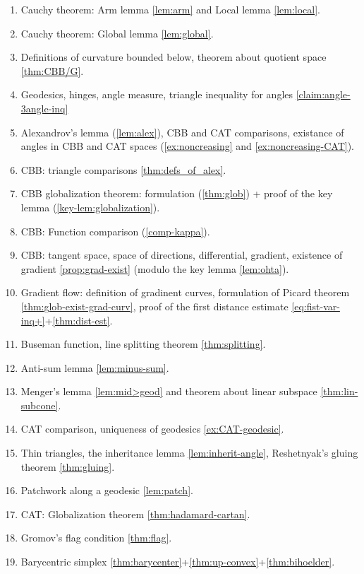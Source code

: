 \begin{enumerate}
\item Cauchy theorem: Arm lemma \ref{lem:arm} and Local lemma \ref{lem:local}.
\item Cauchy theorem: Global lemma \ref{lem:global}.
\item Definitions of curvature bounded below, theorem about quotient space \ref{thm:CBB/G}.
\item Geodesics, hinges, angle measure, triangle inequality for angles \ref{claim:angle-3angle-inq}
\item Alexandrov's lemma (\ref{lem:alex}), CBB and CAT comparisons,
existance of angles in CBB and CAT spaces (\ref{ex:noncreasing} and \ref{ex:noncreasing-CAT}).
\item CBB: triangle comparisons \ref{thm:defs_of_alex}.
\item CBB globalization theorem: formulation (\ref{thm:glob})  + proof of the key lemma (\ref{key-lem:globalization}). 
\item CBB: Function comparison (\ref{comp-kappa}).
\item CBB: tangent space, space of directions, differential, gradient, existence of gradient \ref{prop:grad-exist} (modulo the key lemma \ref{lem:ohta}).
\item Gradient flow: definition of gradinent curves, formulation of Picard theorem \ref{thm:glob-exist-grad-curv}, proof of the first distance estimate \ref{eq:fist-var-inq+}+\ref{thm:dist-est}.
\item Buseman function, line splitting theorem \ref{thm:splitting}.
\item Anti-sum lemma \ref{lem:minus-sum}.
\item Menger’s lemma \ref{lem:mid>geod} and theorem about linear subspace \ref{thm:lin-subcone}.
\item CAT comparison, uniqueness of geodesics \ref{ex:CAT-geodesic}.
\item Thin triangles, the inheritance lemma \ref{lem:inherit-angle}, Reshetnyak's gluing theorem \ref{thm:gluing}.
\item Patchwork along a geodesic \ref{lem:patch}.
\item CAT: Globalization theorem \ref{thm:hadamard-cartan}.
\item Gromov's flag condition \ref{thm:flag}.
\item Barycentric simplex \ref{thm:barycenter}+\ref{thm:up-convex}+\ref{thm:bihoelder}.
\end{enumerate}

